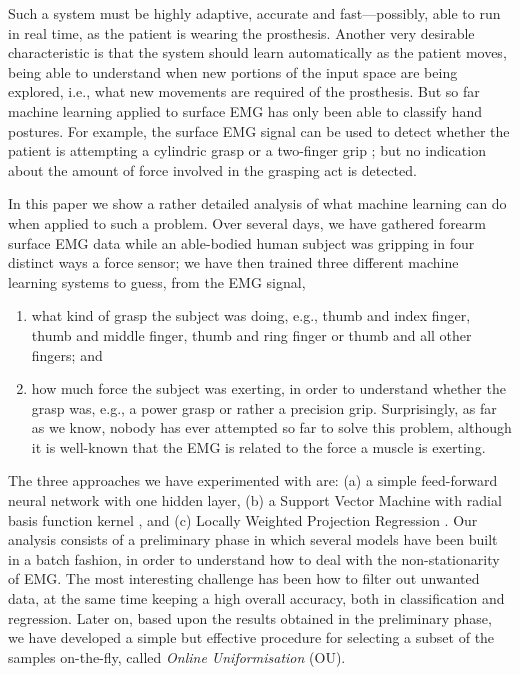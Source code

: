 Such a system must be highly adaptive, accurate and fast---possibly,
able to run in real time, as the patient is wearing the prosthesis.
Another very desirable characteristic is that the system should learn
automatically as the patient moves, being able to understand when new
portions of the input space are being explored, i.e., what new
movements are required of the prosthesis. But so far machine learning
applied to surface EMG has only been able to classify hand postures.
For example, the surface EMG signal can be used to detect whether the
patient is attempting a cylindric grasp or a two-finger grip
\cite{ekvall}; but no indication about the amount of force involved in
the grasping act is detected.

In this paper we show a rather detailed analysis of what machine
learning can do when applied to such a problem. Over several days, we have
gathered forearm surface EMG data while an able-bodied human subject
was gripping in four distinct ways a force sensor; we have then
trained three different machine learning systems to guess, from the
EMG signal,
\begin{enumerate}

  \item what kind of grasp the subject was doing, e.g., thumb and
    index finger, thumb and middle finger, thumb and ring finger or
    thumb and all other fingers; and

  \item how much force the subject was exerting, in order to
    understand whether the grasp was, e.g., a power grasp or rather a
    precision grip. Surprisingly, as far as we know, nobody has ever
    attempted so far to solve this problem, although it is well-known
    that the EMG is related to the force a muscle is exerting.

\end{enumerate}

The three approaches we have experimented with are:
(a) a simple feed-forward neural network with one hidden layer,
(b) a Support Vector Machine with radial basis function kernel
\cite{BGV92}, and (c) Locally Weighted Projection Regression
\cite{lwpr}. Our analysis consists of a preliminary phase in which
several models have been built in a batch fashion, in order to
understand how to deal with the non-stationarity of EMG. The most
interesting challenge has been how to filter out unwanted data, at the
same time keeping a high overall accuracy, both in classification and
regression. Later on, based upon the results obtained in the
preliminary phase, we have developed a simple but effective procedure
for selecting a subset of the samples on-the-fly, called \emph{Online
Uniformisation} (OU).

